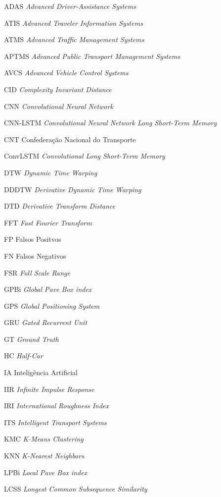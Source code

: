 \begin{siglas}
\item[ADAS] \textit{Advanced Driver-Assistance Systems}
\item[ATIS] \textit{Advanced Traveler Information Systems}
\item[ATMS] \textit{Advanced Traffic Management Systems}
\item[APTMS] \textit{Advanced Public Transport Management Systems}
\item[AVCS] \textit{Advanced Vehicle Control Systems}
\item[CID] \textit{Complexity Invariant Distance}
\item[CNN] \textit{Convolutional Neural Network}
\item[CNN-LSTM] \textit{Convolutional Neural Network Long Short-Term Memory}
\item[CNT] Confederação Nacional do Transporte
\item[ConvLSTM] \textit{Convolutional Long Short-Term Memory}
\item[DTW] \textit{Dynamic Time Warping}
\item[DDDTW] \textit{Derivative Dynamic Time Warping}
\item[DTD] \textit{Derivative Transform Distance}
\item[FFT] \textit{Fast Fourier Transform}
\item[FP] Falsos Positvos
\item[FN] Falsos Negativos
\item[FSR] \textit{Full Scale Range}
\item[GPBi] \textit{Global Pave Box index}
\item[GPS] \textit{Global Positioning System}
\item[GRU] \textit{Gated Recurrent Unit}
\item[GT] \textit{Ground Truth}
\item[HC] \textit{Half-Car}
\item[IA] Inteligência  Artificial
\item[IIR] \textit{Infinite Impulse Response}
\item[IRI] \textit{International Roughness Index}
\item[ITS] \textit{Intelligent Transport Systems}
\item[KMC] \textit{K-Means Clustering}
\item[KNN] \textit{K-Nearest Neighbors}
\item[LPBi] \textit{Local Pave Box index}
\item[LCSS] \textit{Longest Common Subsequence Similarity}

\end{siglas}
